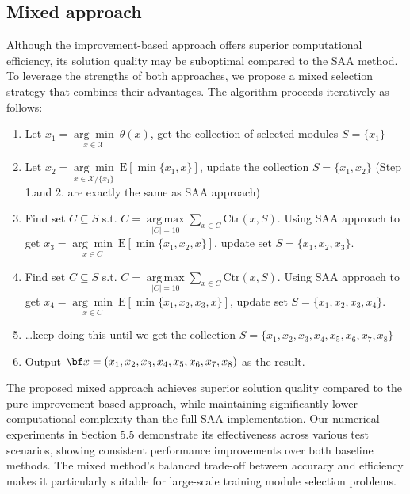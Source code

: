 \documentclass[opre,sglanonrev]{informs4}
\begin{document}
\subsection{Mixed approach}
Although the improvement-based approach offers superior computational efficiency, its solution quality may be suboptimal compared to the SAA method. To leverage the strengths of both approaches, we propose a mixed selection strategy that combines their advantages. The algorithm proceeds iteratively as follows:
\begin{enumerate}
	\item Let $x_1 = \underset{x\in \mathcal{X}}{{\arg\min}}~\theta(x)$, get the collection of selected modules $S = \{x_1\}$
	\item Let $x_2 = \underset{x\in \mathcal{X}/\{x_1\}}{{\arg\min}}~\text{E}[\min\{x_1, x\}]$, update the collection $S = \{x_1,x_2\}$ (Step 1.and 2. are exactly the same as SAA approach)
	\item Find set $C \subseteq S$ s.t.  $C = \mathop{\mathrm{arg\,max}}\limits_{|C|=10} \sum_{x \in C} \text{Ctr}(x, S)$. Using SAA approach to get $x_3 = \underset{x\in C}{{\arg\min}}~\text{E}[\min\{x_1, x_2, x\}]$, update set $S = \{x_1,x_2,x_3\}$.
	\item Find set $C \subseteq S$ s.t.  $C = \mathop{\mathrm{arg\,max}}\limits_{|C|=10} \sum_{x \in C} \text{Ctr}(x, S)$. Using SAA approach to get $x_4 = \underset{x\in C}{{\arg\min}}~\text{E}[\min\{x_1, x_2, x_3, x\}]$, update set $S = \{x_1,x_2,x_3,x_4\}$.
	\item \ldots keep doing this until we get the collection $S = \{x_1,x_2,x_3,x_4,x_5,x_6,x_7,x_8\}$
	\item Output ${\bf x} = (x_1,x_2,x_3,x_4,x_5,x_6,x_7,x_8)$ as the result.
\end{enumerate}
The proposed mixed approach achieves superior solution quality compared to the pure improvement-based approach, while maintaining significantly lower computational complexity than the full SAA implementation. Our numerical experiments in Section 5.5 demonstrate its effectiveness across various test scenarios, showing consistent performance improvements over both baseline methods. The mixed method's balanced trade-off between accuracy and efficiency makes it particularly suitable for large-scale training module selection problems.
\end{document}

